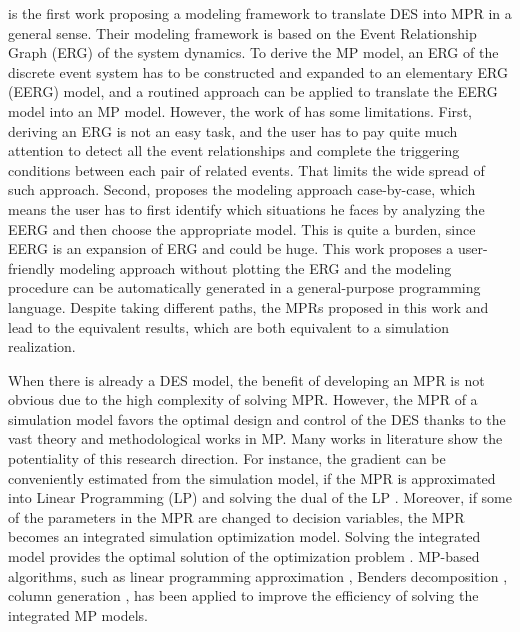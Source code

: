 \documentclass[]{interact}
\theoremstyle{plain}%
\theoremstyle{definition}
\theoremstyle{remark}
\begin{document}
 \cite{chan2008optimization} is the first work proposing a modeling framework to translate DES into MPR in a general sense. Their modeling framework is based on the Event Relationship Graph (ERG) of the system dynamics. To derive the MP model, an ERG of the discrete event system has to be constructed and expanded to an elementary ERG (EERG) model, and a routined approach can be applied to translate the EERG model into an MP model. However, the work of \cite{chan2008optimization} has some limitations. First, deriving an ERG is not an easy task, and the user has to pay quite much attention to detect all the event relationships and complete the triggering conditions between each pair of related events. That limits the wide spread of such approach. Second, \cite{chan2008optimization} proposes the modeling approach case-by-case, which means the user has to first identify which situations he faces by analyzing the EERG and then choose the appropriate model. This is quite a burden, since EERG is an expansion of ERG and could be huge. This work proposes a user-friendly modeling approach without plotting the ERG and the modeling procedure can be automatically generated in a general-purpose programming language. Despite taking different paths, the MPRs proposed in this work and \cite{chan2008optimization} lead to the equivalent results, which are both equivalent to a simulation realization.

When there is already a DES model, the benefit of developing an MPR is not obvious due to the high complexity of solving MPR. 
However, the MPR of a simulation model favors the optimal design and control of the DES thanks to the vast theory and methodological works in MP. Many works in literature show the potentiality of this research direction. For instance, the gradient can be conveniently estimated from the simulation model, if the MPR  is approximated into Linear Programming (LP) and solving the dual of the LP \citep{chan2008optimization, zhang2020simulation}. Moreover, if some of the parameters in the MPR are changed to decision variables, the MPR becomes an integrated simulation optimization model. Solving the integrated model provides the optimal solution of the optimization problem \citep{matta2008simulation}. MP-based algorithms, such as linear programming approximation \citep{alfieri2012mathematical}, Benders decomposition \citep{weiss2015buffer}, column generation \citep{alfieri2020time}, has been applied to improve the efficiency of solving the integrated MP models. 
\end{document}
